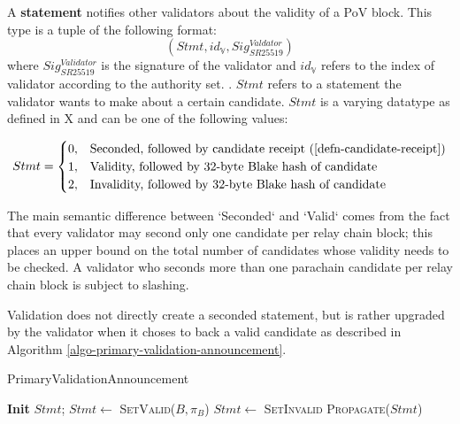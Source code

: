 \begin{definition}
  \label{defn-gossip-statement}
  A \textbf{statement} notifies other validators about the validity of a PoV block.
  This type is a tuple of the following format:
  \[
  (Stmt, id_{\mathbb{V}}, Sig^{Valdator}_{SR25519})
  \]
  where $Sig^{Validator}_{SR25519}$ is the signature of the validator and
  $id_{\mathbb{V}}$ refers to the index of validator according to the authority
  set. . $Stmt$
  refers to a statement the validator wants to make about a certain candidate.
  $Stmt$ is a varying datatype as defined in X  and can be one
  of the following values:

\begin{equation}
  Stmt =
  \begin{cases}
    0, & \text{Seconded, followed by candidate receipt (\ref{defn-candidate-receipt})} \\
    1, & \text{Validity, followed by 32-byte Blake hash of candidate} \\
    2, & \text{Invalidity, followed by 32-byte Blake hash of candidate}
  \end{cases}
\end{equation}
\end{definition}

The main semantic difference between `Seconded` and `Valid` comes from the fact
that every validator may second only one candidate per relay chain block; this
places an upper bound on the total number of candidates whose validity needs to
be checked. A validator who seconds more than one parachain candidate per relay
chain block is subject to slashing.
\newline

Validation does not directly create a seconded statement, but is rather upgraded
by the validator when it choses to back a valid candidate as described in
Algorithm \ref{algo-primary-validation-announcement}.

\begin{algorithm}[H]
  \caption[PrimaryValidationAnnouncement]{\sc PrimaryValidationAnnouncement}
  \label{algo-primary-validation-announcement}
  \begin{algorithmic}[1]
      \State \textbf{Init} $Stmt$;
        \State $Stmt \leftarrow$ \textsc{SetValid($B, \pi_B$)}
      \Else
        \State $Stmt \leftarrow$ \textsc{SetInvalid}
      \EndIf
      \State \textsc{Propagate}($Stmt$)
  \end{algorithmic}
\end{algorithm}


